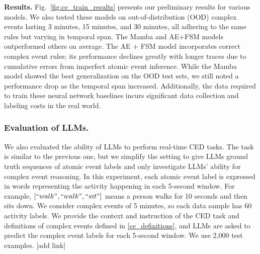 \textbf{Results.} Fig.~\ref{fig:ce_train_results} presents our preliminary results for various models. We also tested these models on out-of-distribution (OOD) complex events lasting 3 minutes, 15 minutes, and 30 minutes, all adhering to the same rules but varying in temporal span. The Mamba and AE+FSM models outperformed others on average. The AE + FSM model incorporates correct complex event rules; its performance declines greatly with longer traces due to cumulative errors from imperfect atomic event inference. While the Mamba model showed the best generalization on the OOD test sets, we still noted a performance drop as the temporal span increased. Additionally, the data required to train these neural network baselines incurs significant data collection and labeling costs in the real world.

\subsubsection{Evaluation of LLMs.}
We also evaluated the ability of LLMs to perform real-time CED tasks. The task is similar to the previous one, but we simplify the setting to give LLMs ground truth sequences of atomic event labels and only investigate LLMs' ability for complex event reasoning. In this experiment,  each atomic event label is expressed in words representing the activity happening in each 5-second window. For example, $[``walk", ``walk", ``sit"]$ means a person walks for 10 seconds and then sits down. We consider complex events of 5 minutes, so each data sample has 60 activity labels. We provide the context and instruction of the CED task and definitions of complex events defined in \ref{ce_definitions}, and LLMs are asked to predict the complex event labels for each 5-second window. We use 2,000 test examples. [add link]

